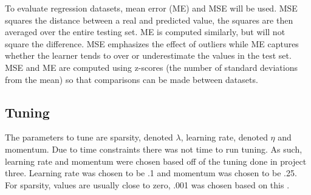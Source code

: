 \documentclass[twoside,11pt]{article}
\begin{document}
	To evaluate regression datasets, mean error (ME) and MSE will be used. MSE squares the distance between a real and predicted value, the squares are then averaged over the entire testing set. 
	ME is computed similarly, but will not square the difference. MSE emphasizes the effect of outliers while ME captures whether the learner tends to over or underestimate the values in the test set. 
	MSE and ME are computed using z-scores (the number of standard deviations from the mean) so that comparisons can be made between datasets.

\subsection{Tuning}
	 The parameters to tune are sparsity, denoted $\lambda$, learning rate, denoted $\eta$ and momentum. Due to time constraints there was not time to run tuning. As such, learning rate and momentum were chosen based off of the tuning done in project three. Learning rate was chosen to be .1 and momentum was chosen to be .25. For sparsity, values are usually close to zero, .001 was chosen based on this \cite{sparsity}.
\end{document}
